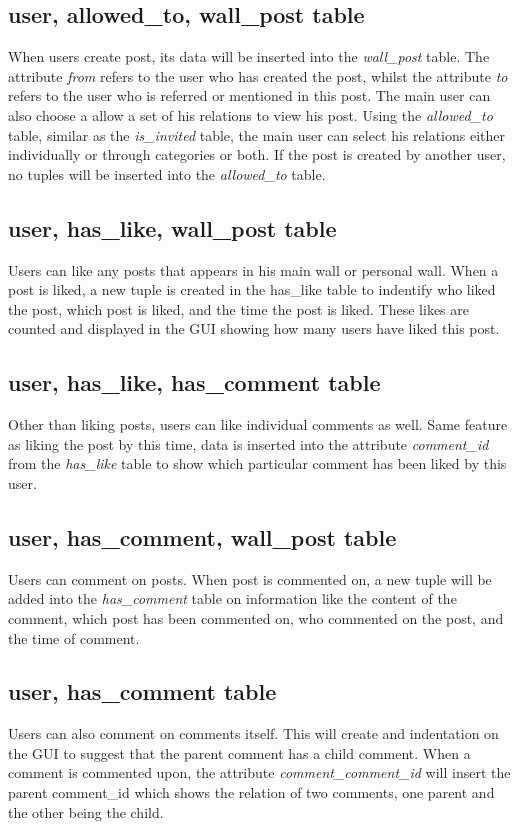 \subsection{user, allowed\_to, wall\_post table}
When users create post, its data will be inserted into the {\it wall\_post} table. The attribute {\it from} refers to the user who has created the post, whilst the attribute {\it to} refers to the user who is referred or mentioned in this post. The main user can also choose a allow a set of his relations to view his post. Using the {\it allowed\_to} table, similar as the {\it is\_invited} table, the main user can select his relations either individually or through categories or both. If the post is created by another user, no tuples will be inserted into the {\it allowed\_to} table.

\subsection{user, has\_like, wall\_post table}
Users can like any posts that appears in his main wall or personal wall. When a post is liked, a new tuple is created in the has\_like table to indentify who liked the post, which post is liked, and the time the post is liked. These likes are counted and displayed in the GUI showing how many users have liked this post.

\subsection{user, has\_like, has\_comment table}
Other than liking posts, users can like individual comments as well. Same feature as liking the post by this time, data is inserted into the attribute {\it comment\_id} from the {\it has\_like} table to show which particular comment has been liked by this user.

\subsection{user, has\_comment, wall\_post table}
Users can comment on posts. When post is commented on, a new tuple will be added into the {\it has\_comment} table on information like the content of the comment, which post has been commented on, who commented on the post, and the time of comment.

\subsection{user, has\_comment table}
Users can also comment on comments itself. This will create and indentation on the GUI to suggest that the parent comment has a child comment. When a comment is commented upon, the attribute {\it comment\_comment\_id} will insert the parent comment\_id which shows the relation of two comments, one parent and the other being the child.

